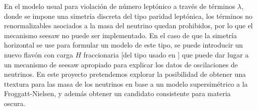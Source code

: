 \begin{ideas}
En el modelo usual para violación de número leptónico a través de términos $\lambda$, donde se impone una simetría discreta del tipo paridad leptónica, los términos no renormalizables asociados a la masa del neutrino quedan prohibidos, por lo que el mecanismo seesaw no puede ser implementado. En el caso de que la simetría horizontal se use para formular un modelo de este tipo, se puede introducir un nuevo flavón con carga $H$ fraccionaria [del tipo usado en \cite{Chen:2008tc}] que puede dar lugar a un mecanismo de seesaw apropiado para explicar los datos de oscilaciones de neutrinos. En este proyecto pretendemos explorar la posibilidad de obtener una ttextura para las masa de los neutrinos en base a un modelo supersimétrico a la Froggatt-Nielsen, y además obtener un candidato consistente para materia oscura.

\end{ideas}


